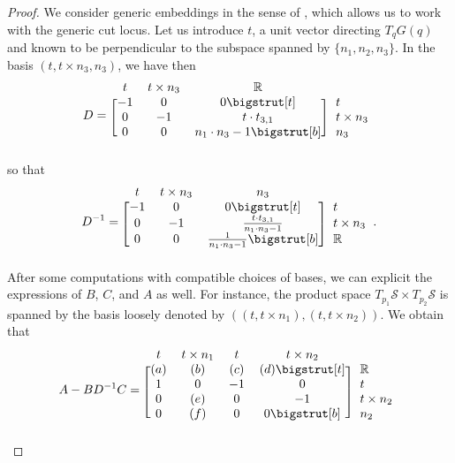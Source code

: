 \documentclass[11pt]{article}
\newcommand{\R}{\mathbb{R}}
\newcommand{\Surf}{\mathcal{S}}
\newcommand\topstrut[1][1.2ex]{\setlength\bigstrutjot{#1}{\bigstrut[t]}}
\newcommand\botstrut[1][1.2ex]{\setlength\bigstrutjot{#1}{\bigstrut[b]}}
\theoremstyle{plain}
\theoremstyle{definition}
\theoremstyle{remark}
\begin{document}
\begin{proof}
We consider generic embeddings in the sense of , which allows us to work with the generic cut locus.
Let us introduce $t$, a unit vector directing $T_q G(q)$ and known to be perpendicular to the subspace spanned by $\{n_1,n_2,n_3\}$.
In the basis $(t,t \times n_3, n_3)$, we have then
\[
D = 
\begin{blockarray}{cccl}
	\begin{block}{cccl}
		t & t \times n_3 & \R & \\
	\end{block}
	\begin{block}{[ccc] l}
		-1 & 0 & 0 \topstrut & t \\
		0 & -1 & t \cdot t_{3,1} & t \times n_3 \\
		0 & 0 & n_1 \cdot n_3 - 1 \botstrut & n_3 \\
	\end{block}
\end{blockarray}
\]
so that
\[
D^{-1} = 
\begin{blockarray}{cccl}
	\begin{block}{cccl}
		t & t \times n_3 & n_3 & \\
	\end{block}
	\begin{block}{[ccc] l}
		-1 & 0 & 0 \topstrut & t \\
		0 & -1 & \frac{t \cdot t_{3,1}}{n_1 \cdot n_3 - 1} & t \times n_3 \\
		0 & 0 & \frac{1}{n_1 \cdot n_3 - 1} \botstrut & \R \\
	\end{block}
\end{blockarray}.
\]
After some computations with compatible choices of bases, we can explicit the expressions of $B$, $C$, and $A$ as well. For instance, the product space $T_{p_1} \Surf \times T_{p_2} \Surf$ is spanned by the basis loosely denoted by $((t, t\times n_1), (t, t \times n_2))$. We obtain that
\[A - B D^{-1} C =
\begin{blockarray}{ccccl}
	\begin{block}{ccccl}
		t & t \times n_1 & t & t \times n_2 & \\
	\end{block}
	\begin{block}{[cccc] l}
		(a) & (b) & (c) & (d) \topstrut & \R \\
		1 & 0 & -1 & 0 & t \\
		0 & (e) & 0 & -1 & t \times n_2 \\
		0 & (f) & 0 & 0 \botstrut & n_2 \\

\end{block}
\end{blockarray}\]
\end{proof}
\end{document}
